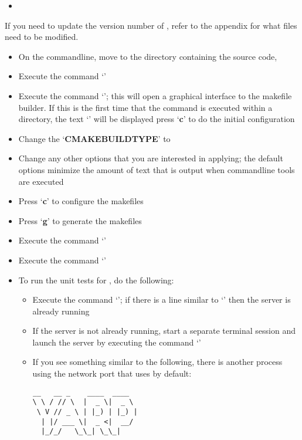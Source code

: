 \tertiaryEnd
{}
\begin{itemize}
\item\TBD
\end{itemize}
\tertiaryEnd
{}
If you need to update the version number of \mplusm, refer to the
 appendix for what files
need to be modified.
\begin{itemize}
\item On the command\longDash{}line, move to the directory containing the \mplusm{} source
code, 
\item\exSp{}Execute the command `'
\item\exSp{}Execute the command `'; this will open a graphical interface
to the makefile builder. If this is the first time that the command is executed within a
directory, the text `' will be displayed \longDash{} press
`\textbf{c}' to do the initial configuration
\item\exSp{}Change the `\textbf{CMAKE\fUS{}BUILD\fUS{}TYPE}' to 
\item\exSp{}Change any other options that you are interested in applying; the default
options minimize the amount of text that is output when \mplusm{} command\longDash{}line
tools are executed
\item\exSp{}Press `\textbf{c}' to configure the makefiles
\item\exSp{}Press `\textbf{g}' to generate the makefiles
\item\exSp{}Execute the command `'
\item\exSp{}Execute the command `'
\item\exSp{}To run the unit tests for \mplusm, do the following:
\begin{itemize}
\item Execute the command `'; if there is a line
similar to `' then the \yarp{}
server is already running
\item\exSp{}If the \yarp{} server is not already running, start a separate terminal
session and launch the \yarp{} server by executing the command `'
\item\exSp{}If you see something similar to the following, there is another process using
the network port that \yarp{} uses by default:
\outputBegin
\begin{verbatim}
__   __ _    ____  ____  
\ \ / // \  |  _ \|  _ \ 
 \ V // _ \ | |_) | |_) |
  | |/ ___ \|  _ <|  __/ 
  |_/_/   \_\_| \_\_|    


\end{verbatim}
\end{itemize}
\end{itemize}

